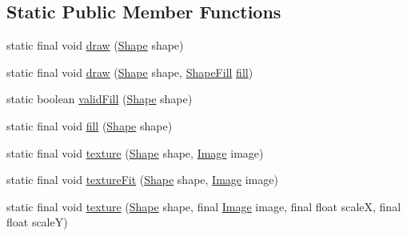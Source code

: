 \subsection*{Static Public Member Functions}
\begin{DoxyCompactItemize}
\item 
static final void \mbox{\hyperlink{classorg_1_1newdawn_1_1slick_1_1geom_1_1_shape_renderer_a631643ec8a7ae96aafd49f2056235b74}{draw}} (\mbox{\hyperlink{classorg_1_1newdawn_1_1slick_1_1geom_1_1_shape}{Shape}} shape)
\item 
static final void \mbox{\hyperlink{classorg_1_1newdawn_1_1slick_1_1geom_1_1_shape_renderer_a8e2681c886505d6546aff8e7bbfef866}{draw}} (\mbox{\hyperlink{classorg_1_1newdawn_1_1slick_1_1geom_1_1_shape}{Shape}} shape, \mbox{\hyperlink{interfaceorg_1_1newdawn_1_1slick_1_1_shape_fill}{Shape\+Fill}} \mbox{\hyperlink{classorg_1_1newdawn_1_1slick_1_1geom_1_1_shape_renderer_a798dd59aef1deb87fdfcc4fbff59ecef}{fill}})
\item 
static boolean \mbox{\hyperlink{classorg_1_1newdawn_1_1slick_1_1geom_1_1_shape_renderer_a1e630761b7f3631a05e0eb8e9d9ce091}{valid\+Fill}} (\mbox{\hyperlink{classorg_1_1newdawn_1_1slick_1_1geom_1_1_shape}{Shape}} shape)
\item 
static final void \mbox{\hyperlink{classorg_1_1newdawn_1_1slick_1_1geom_1_1_shape_renderer_a798dd59aef1deb87fdfcc4fbff59ecef}{fill}} (\mbox{\hyperlink{classorg_1_1newdawn_1_1slick_1_1geom_1_1_shape}{Shape}} shape)
\item 
static final void \mbox{\hyperlink{classorg_1_1newdawn_1_1slick_1_1geom_1_1_shape_renderer_ad2056c37d2e8613c99ee10c3c3ea5e96}{texture}} (\mbox{\hyperlink{classorg_1_1newdawn_1_1slick_1_1geom_1_1_shape}{Shape}} shape, \mbox{\hyperlink{classorg_1_1newdawn_1_1slick_1_1_image}{Image}} image)
\item 
static final void \mbox{\hyperlink{classorg_1_1newdawn_1_1slick_1_1geom_1_1_shape_renderer_ad6d48583699bfb39ff6d17decbd03634}{texture\+Fit}} (\mbox{\hyperlink{classorg_1_1newdawn_1_1slick_1_1geom_1_1_shape}{Shape}} shape, \mbox{\hyperlink{classorg_1_1newdawn_1_1slick_1_1_image}{Image}} image)
\item 
static final void \mbox{\hyperlink{classorg_1_1newdawn_1_1slick_1_1geom_1_1_shape_renderer_ae6467e2621a90c989ab6e9762914307d}{texture}} (\mbox{\hyperlink{classorg_1_1newdawn_1_1slick_1_1geom_1_1_shape}{Shape}} shape, final \mbox{\hyperlink{classorg_1_1newdawn_1_1slick_1_1_image}{Image}} image, final float scaleX, final float scaleY)
\item 

\end{DoxyCompactItemize}
